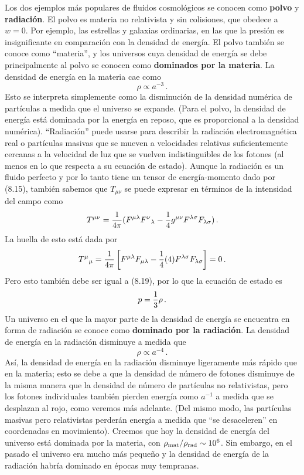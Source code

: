 \documentclass[11pt,b5paper,openany,twoside]{book}
\newcommand{\mn}{{\mu\nu}}
\begin{document}
Los dos ejemplos más populares de fluidos cosmológicos se conocen como {\bf polvo} y {\bf radiación}.
El polvo es materia no relativista y sin colisiones, que obedece a $w=0$.
Por ejemplo, las estrellas y galaxias ordinarias, en las que la presión es insignificante en comparación con la densidad de energía.
El polvo también se conoce como ``materia'', y los universos cuya densidad de energía se debe principalmente al polvo se conocen como {\bf dominados por la materia}.
La densidad de energía en la materia cae como
\begin{equation}
\rho\propto a^{-3}\,.\label{8.24}
\end{equation}
Esto se interpreta simplemente como la disminución de la densidad numérica de partículas a medida que el universo se expande.
(Para el polvo, la densidad de energía está dominada por la energía en reposo, que es proporcional a la densidad numérica). ``Radiación'' puede usarse para describir la radiación electromagnética real o partículas masivas que se mueven a velocidades relativas suficientemente cercanas a la velocidad de luz que se vuelven indistinguibles de los fotones (al menos en lo que respecta a su ecuación de estado).
Aunque la radiación es un fluido perfecto y por lo tanto tiene un tensor de energía-momento dado por (8.15), también sabemos que $T_\mn$ se puede expresar en términos de la intensidad del campo como
\begin{equation}
T^\mn = {1\over{4\pi}}(F^{\mu\lambda}F^\nu{}_\lambda
-{1\over 4}g^{\mu\nu} F^{\lambda\sigma}F_{\lambda\sigma})\,.
\label{8.25}
\end{equation}
La huella de esto está dada por
\begin{equation}
T^\mu{}_\mu = {1\over{4\pi}}\left[F^{\mu\lambda}F_{\mu\lambda}
-{1\over 4}(4)F^{\lambda\sigma}F_{\lambda\sigma}\right] = 0\,.\label{8.26}
\end{equation}
Pero esto también debe ser igual a (8.19), por lo que la ecuación de estado es
\begin{equation}
p = {1\over 3}\rho\,.\label{8.27}
\end{equation}
Un universo en el que la mayor parte de la densidad de energía se encuentra en forma de radiación se conoce como {\bf dominado por la radiación}.
La densidad de energía en la radiación disminuye a medida que
\begin{equation}
\rho \propto a^{-4}\,.\label{8.28}
\end{equation}
Así, la densidad de energía en la radiación disminuye ligeramente más rápido que en la materia; esto se debe a que la densidad de número de fotones disminuye de la misma manera que la densidad de número de partículas no relativistas, pero los fotones individuales también pierden energía como $a^{-1}$ a medida que se desplazan al rojo, como veremos más adelante.
(Del mismo modo, las partículas masivas pero relativistas perderán energía a medida que ``se desaceleren'' en coordenadas en movimiento).
Creemos que hoy la densidad de energía del universo está dominada por la materia, con $\rho_{\rm mat}/\rho_{\rm rad}\sim10^6$.
Sin embargo, en el pasado el universo era mucho más pequeño y la densidad de energía de la radiación habría dominado en épocas muy tempranas.
\end{document}

